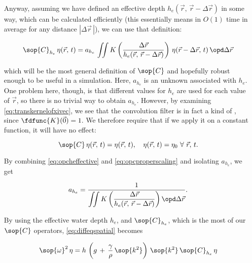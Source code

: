 
Anyway, assuming we have defined an effective depth \mbox{$h_e(\vec{r},\,\vec{r}-\Delta\vec{r})$} in some way, which can be calculated efficiently (this essentially means in $O(1)$ time in average for any distance $|\Delta\vec{r}\,|$), we can use that definition:

\begin{equation} \label{eq:opcheffective}
\sop{C}_{h_e}\,\eta(\vec{r},\,t) = a_{h_e}\,\iint K\left(\frac{\Delta\vec{r}}{h_e(\vec{r},\,\vec{r}-\Delta\vec{r})}\right)\,\eta(\vec{r}-\Delta\vec{r},\,t)\,\opd\Delta\vec{r}
\end{equation}

which will be the most general definition of $\sop{C}$ and hopefully robust enough to be useful in a simulation. Here, $a_{h_e}$ is an unknown  associated with $h_e$. One problem here, though, is that different values for $h_e$ are used for each value of $\vec{r}$, so there is no trivial way to obtain $a_{h_e}$. However, by examining \eqref{eq:transkernelofxivec}, we see that the convolution filter is in fact a kind of , since $\fdfunc{K}(\vec{0}) = 1$. We therefore require that if we apply it on a constant function, it will have no effect:

\begin{equation} \label{eq:opcproperscaling}
\sop{C}\,\eta(\vec{r},\,t) = \eta(\vec{r},\,t),\quad\eta(\vec{r},\,t) = \eta_0\ \forall\ \vec{r},\,t.
\end{equation}

By combining \eqref{eq:opcheffective} and \eqref{eq:opcproperscaling} and isolating $a_{h_e}$, we get

\begin{equation} \label{eq:scalingheffective}
a_{h_e} = \frac{1}{\displaystyle\iint K\left(\frac{\Delta\vec{r}}{h_e(\vec{r},\,\vec{r}-\Delta\vec{r})}\right) \opd\Delta\vec{r}}.
\end{equation}

By using the effective water depth $h_e$, and $\sop{C}_{h_e}$, which is the most  of our $\sop{C}$ operators, \eqref{eq:diffeqspatial} becomes

\begin{equation} \label{eq:diffeqonehstillunknown}
\sop{\omega}^2\,\eta = h\,\left(g\,+\,\frac{\gamma}{\rho}\,\sop{k^2}\right)\,\sop{k^2}\,\sop{C}_{h_e}\,\eta
\end{equation}

